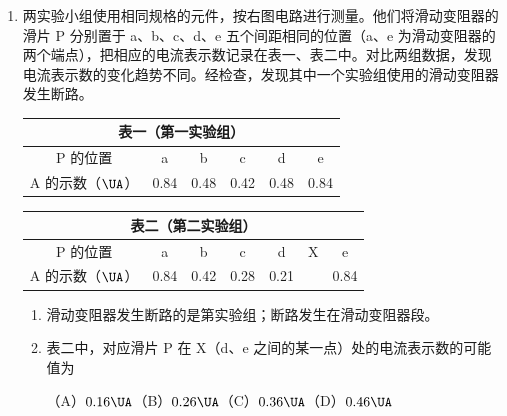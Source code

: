 \documentclass[\gkver]{gaokaozhenti}
\begin{document}
\begin{enumerate}
{\onepicture[w=4.38cm]{}

（2）因电路中电流最大为 $\frac{100\UV}{100\UO}=1\UA$，为了保证安全应选 $0\sim 3\UA$ 的量程。

（3）灯泡正常工作，则灯泡两端的电压应为 $10\UV$，灯泡的电阻 $R=\frac{U^{2}}{P}=20\UO$。设并联的电阻丝长度为 $x$，则并联的电阻应为 $100x$，由串联电路的电压分配的特点知 $\frac{\frac{100x\times20}{100x+20}}{100(1-x)}=\frac{1}{9}$，解得 $x=\frac{3\sqrt{5}-5}{10}\Um\approx0.17\Um$。
}

\item
两实验小组使用相同规格的元件，按右图电路进行测量。他们将滑动变阻器的滑片 P 分别置于 a、b、c、d、e 五个间距相同的位置（a、e 为滑动变阻器的两个端点），把相应的电流表示数记录在表一、表二中。对比两组数据，发现电流表示数的变化趋势不同。经检查，发现其中一个实验组使用的滑动变阻器发生断路。

\begin{center}
\begin{tabular}{|c|c|c|c|c|c|}
\hline
\multicolumn{6}{|c|}{表一（第一实验组）} \\ \hline
P 的位置 & a & b & c & d & e \\ \hline
A 的示数（$\UA$） & 0.84 & 0.48 & 0.42 & 0.48 & 0.84 \\ \hline
\end{tabular}

\vspace{0.5em}

\begin{tabular}{|c|c|c|c|c|c|c|}
\hline
\multicolumn{7}{|c|}{表二（第二实验组）} \\ \hline
P 的位置 & a & b & c & d & X & e \\ \hline
A 的示数（$\UA$） & 0.84 & 0.42 & 0.28 & 0.21 & & 0.84 \\ \hline
\end{tabular}
\end{center}

\begin{enumerate}
	\item
	滑动变阻器发生断路的是第实验组；断路发生在滑动变阻器段。
	\item
	表二中，对应滑片 P 在 X（d、e 之间的某一点）处的电流表示数的可能值为

	（A）$0.16\UA$\qquad（B）$0.26\UA$\qquad（C）$0.36\UA$\qquad（D）$0.46\UA$
\end{enumerate}


\end{enumerate}
\end{document}
